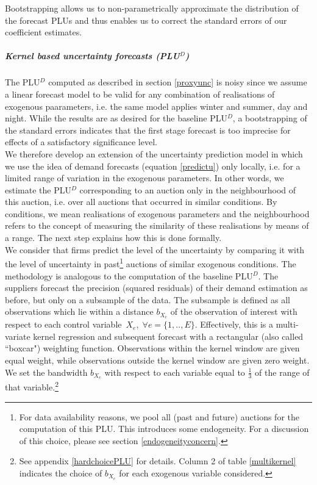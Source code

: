 Bootstrapping allows us to non-parametrically approximate the distribution of the forecast PLUs and thus enables us to correct the standard errors of our coefficient estimates. 

\subparagraph{Kernel based uncertainty forecasts (PLU$^D$)}
\label{robustunc}

The PLU$^D$ computed as described in section \ref{proxyunc} is noisy since we assume a linear forecast model to be valid for any combination of realisations of exogenous paarameters, i.e. the same model applies winter and summer, day and night. 
While the results are as desired for the baseline PLU$^D$, a bootstrapping of the standard errors indicates that the first stage forecast is too imprecise for effects of a satisfactory significance level. \\

We therefore develop an extension of the uncertainty prediction model  in which we use the idea of demand forecasts (equation \ref{predictu}) only locally, i.e. for a limited range of variation in the exogenous parameters. In other words, we estimate the PLU$^D$ corresponding to an auction only in the neighbourhood of this auction, i.e. over all auctions that occurred in similar conditions. By conditions, we mean realisations of exogenous parameters and the neighbourhood refers to the concept of measuring the similarity of these realisations by means of a range. The next step explains how this is done formally. \\

We consider that firms predict the level of the uncertainty by comparing it with the level of uncertainty in past\footnote{For data availability reasons, we pool all (past and future) auctions for the computation of this PLU. This introduces some endogeneity. For a discussion of this choice, please see section \ref{endogeneityconcern}.} auctions of similar exogenous conditions. 
The methodology is analogous to the computation of the baseline PLU$^D$. The suppliers forecast the precision (squared residuals) of their demand estimation as before, but only on a subsample of the data. The subsample is defined as all observations which lie within a distance $b_{X_e}$ of the observation of interest with respect to each %
control variable~$X_e , \; \forall e=\{1,..,E\}$. Effectively, this is a multi-variate kernel regression and subsequent forecast with a rectangular (also called ``boxcar") weighting function. Observations within the kernel window are given equal weight, while observations outside the kernel window are given zero weight. We set the bandwidth $b_{X_e}$ with respect to each variable equal to $\frac{1}{3}$ of the range of that variable.\footnote{See appendix \ref{hardchoicePLU} for details. Column 2 of table \ref{multikernel} indicates the choice of $b_{X_e}$ for each exogenous variable considered.} \\


